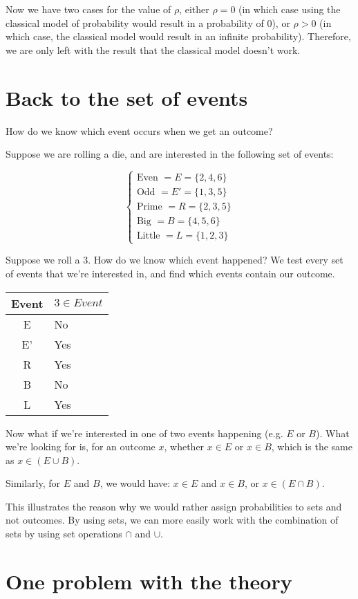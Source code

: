 \documentclass{article}
\begin{document}
Now we have two cases for the value of $\rho$, either $\rho=0$ (in
which case using the classical model of probability would result in a
probability of $0$), or $\rho>0$ (in which case, the classical model
would result in an infinite probability). Therefore, we are only left
with the result that the classical model doesn't work.

\section*{Back to the set of events}

How do we know which event occurs when we get an outcome?

Suppose we are rolling a die, and are interested in the following set
of events:

\[
\begin{cases}
\text{Even } = E = \{2, 4, 6\} \\
\text{Odd } = E' = \{1, 3, 5\} \\
\text{Prime } = R = \{2, 3, 5\} \\
\text{Big } = B = \{4, 5, 6\} \\
\text{Little } = L = \{1, 2, 3\}
\end{cases}
\]

Suppose we roll a $3$. How do we know which event happened? We test
every set of events that we're interested in, and find which events
contain our outcome.

\begin{tabular}{c|l}
Event & $3 \in Event$ \\
\hline
E & No \\
E' & Yes \\
R & Yes \\
B & No \\
L & Yes
\end{tabular}

Now what if we're interested in one of two events happening (e.g. $E$
or $B$). What we're looking for is, for an outcome $x$, whether
$x\in{}E$ or $x\in B$, which is the same as $x\in(E\cup B)$.

Similarly, for $E$ and $B$, we would have: $x\in E$ and $x\in B$, or
$x\in{}(E\cap{}B)$.

This illustrates the reason why we would rather assign probabilities
to sets and not outcomes. By using sets, we can more easily work with
the combination of sets by using set operations $\cap$ and $\cup$.

\section*{One problem with the theory}
\end{document}
